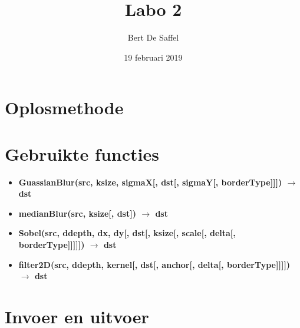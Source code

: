 \documentclass{article}
\begin{document}
	\title{Labo 2}
	\author{Bert De Saffel}
	\date{19 februari 2019}
	\maketitle
	
	\section{Oplosmethode}
	
	\section{Gebruikte functies}
	\begin{itemize}
		 \item \textbf{GuassianBlur(src, ksize, sigmaX[, dst[, sigmaY[, borderType]]]) $\rightarrow$ dst}
		
		 \item \textbf{medianBlur(src, ksize[, dst]) $\rightarrow$ dst}
		 
		 \item \textbf{Sobel(src, ddepth, dx, dy[, dst[, ksize[, scale[, delta[, borderType]]]]]) $\rightarrow$ dst}
		 
		 \item \textbf{filter2D(src, ddepth, kernel[, dst[, anchor[, delta[, borderType]]]]) $\rightarrow$ dst}
		
		
		
		
	\end{itemize}

	\section{Invoer en uitvoer}
	
\end{document}
